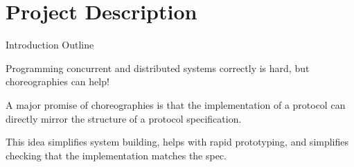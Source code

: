 \maketitle

\section{Project Description}
\label{sec:intro}

\iffalse
\begin{outline}{Introduction Outline}
  \item Programming concurrent and distributed systems correctly is hard, but choreographies can help!
    \begin{lvl}
      \item A major promise of choreographies is that the implementation of a protocol
        can directly mirror the structure of a protocol specification.
      \item This idea simplifies system building, helps with rapid prototyping, and simplifies checking that the implementation matches the spec.
    \end{lvl}


\end{outline}
